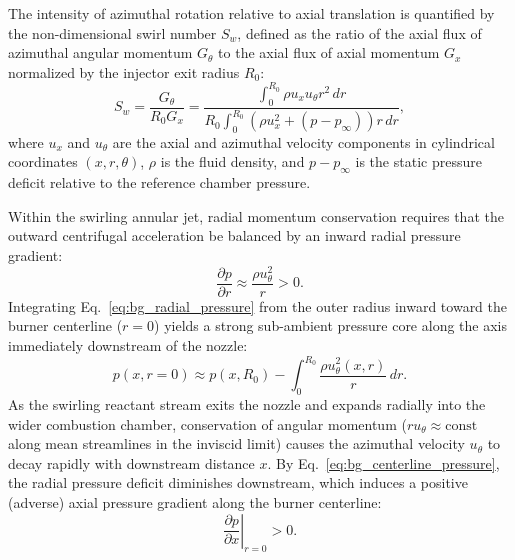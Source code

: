 The intensity of azimuthal rotation relative to axial translation is quantified by the non-dimensional swirl number $S_w$, defined as the ratio of the axial flux of azimuthal angular momentum $G_\theta$ to the axial flux of axial momentum $G_x$ normalized by the injector exit radius $R_0$:
\begin{equation}
    S_w = \frac{G_\theta}{R_0 G_x} = \frac{\int_0^{R_0} \rho u_x u_\theta r^2 \, dr}{R_0 \int_0^{R_0} \left(\rho u_x^2 + (p - p_\infty)\right) r \, dr},
    \label{eq:bg_swirl_number}
\end{equation}
where $u_x$ and $u_\theta$ are the axial and azimuthal velocity components in cylindrical coordinates $(x, r, \theta)$, $\rho$ is the fluid density, and $p - p_\infty$ is the static pressure deficit relative to the reference chamber pressure.

Within the swirling annular jet, radial momentum conservation requires that the outward centrifugal acceleration be balanced by an inward radial pressure gradient:
\begin{equation}
    \frac{\partial p}{\partial r} \approx \frac{\rho u_\theta^2}{r} > 0.
    \label{eq:bg_radial_pressure}
\end{equation}
Integrating Eq.~\eqref{eq:bg_radial_pressure} from the outer radius inward toward the burner centerline ($r = 0$) yields a strong sub-ambient pressure core along the axis immediately downstream of the nozzle:
\begin{equation}
    p(x, r=0) \approx p(x, R_0) - \int_0^{R_0} \frac{\rho u_\theta^2(x, r)}{r} \, dr.
    \label{eq:bg_centerline_pressure}
\end{equation}
As the swirling reactant stream exits the nozzle and expands radially into the wider combustion chamber, conservation of angular momentum ($r u_\theta \approx \text{const}$ along mean streamlines in the inviscid limit) causes the azimuthal velocity $u_\theta$ to decay rapidly with downstream distance $x$. By Eq.~\eqref{eq:bg_centerline_pressure}, the radial pressure deficit diminishes downstream, which induces a positive (adverse) axial pressure gradient along the burner centerline:
\begin{equation}
    \left.\frac{\partial p}{\partial x}\right|_{r=0} > 0.
    \label{eq:bg_adverse_dpdx}
\end{equation}

